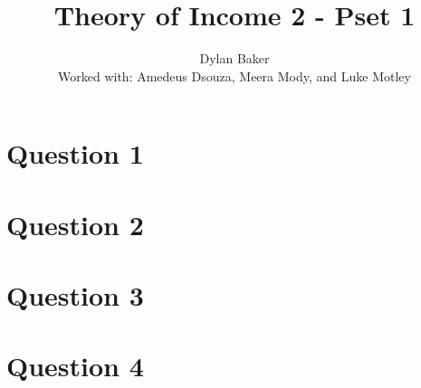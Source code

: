 \documentclass[10pt]{article}
\title{Theory of Income 2 - Pset 1}
\author{Dylan Baker
\\ Worked with: Amedeus Dsouza, Meera Mody, and Luke Motley}
\date{}
\begin{document}
\maketitle

\tableofcontents

\section{Question 1}


\pagebreak

\section{Question 2}


\pagebreak

\section{Question 3}


\pagebreak

\section{Question 4}

\end{document}
